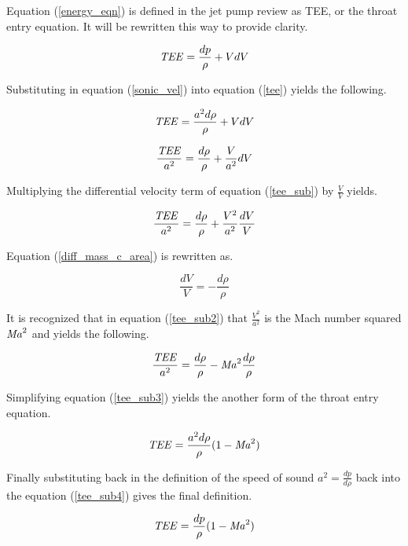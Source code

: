 \documentclass{article}
\newcommand\Mach{\mbox{\textit{Ma}}}  %
\newcommand\Tee{\mbox{\textit{TEE}}}  %
\begin{document}
Equation (\ref{energy_eqn}) is defined in the jet pump review as TEE, or the throat entry equation. It will be rewritten this way to provide clarity.

\begin{equation}
    \Tee = \frac{dp}{\rho} + VdV
\label{tee}
\end{equation}

Substituting in equation (\ref{sonic_vel}) into equation (\ref{tee}) yields the following.

\begin{equation}
    \Tee = \frac{a^2d\rho}{\rho} + VdV
\end{equation}

\begin{equation}
    \frac{\Tee}{a^2} = \frac{d\rho}{\rho} + \frac{V}{a^2}dV
    \label{tee_sub}
\end{equation}

Multiplying the differential velocity term of equation (\ref{tee_sub}) by $\frac{V}{V}$ yields.

\begin{equation}
    \frac{\Tee}{a^2} = \frac{d\rho}{\rho} + \frac{V^2}{a^2}\frac{dV}{V}
    \label{tee_sub2}
\end{equation}

Equation (\ref{diff_mass_c_area}) is rewritten as.

\begin{equation}
    \frac{dV}{V} = - \frac{d\rho}{\rho}
\end{equation}

It is recognized that in equation (\ref{tee_sub2}) that $\frac{V^2}{a^2}$ is the Mach number squared $\Mach^2$ and yields the following.

\begin{equation}
\frac{\Tee}{a^2} = \frac{d\rho}{\rho} - \Mach^2\frac{d\rho}{\rho}
\label{tee_sub3} 
\end{equation}

Simplifying equation (\ref{tee_sub3}) yields the another form of the throat entry equation.

\begin{equation}
    \Tee = \frac{a^2d\rho}{\rho}(1 - \Mach^2)
\label{tee_sub4}    
\end{equation}

Finally substituting back in the definition of the speed of sound $a^2 = \frac{dp}{d\rho}$ back into the equation (\ref{tee_sub4}) gives the final definition.

\begin{equation}
    \Tee = \frac{dp}{\rho}(1 - \Mach^2)
\label{tee_final}    
\end{equation}
\end{document}
